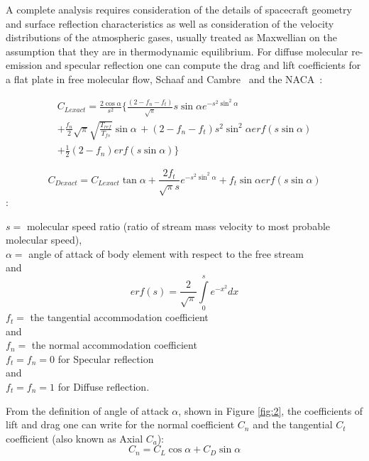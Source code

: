 A complete analysis requires consideration of the details of spacecraft
geometry and surface reflection characteristics as well as consideration
of the velocity distributions of the atmospheric gases, usually treated
as Maxwellian on the assumption that they are in thermodynamic equilibrium.
For diffuse molecular re-emission and specular reflection one can compute
the drag and lift coefficients for a flat plate in free molecular flow,
Schaaf and Cambre~\cite{SC} and the NACA~\cite{NACA}:

\begin{equation}
\begin{split}
C_{Lexact}  = \frac{{2\cos \alpha }}{{s^2 }}\{ \frac{{(2 - f_n  - f_t )}}{{\sqrt \pi  }}s\sin \alpha e^{ - s^2 \sin ^2 \alpha } \\
  + \frac{{f_n }}{2}\sqrt \pi  \sqrt {\frac{{T_{ref} }}{{T_{fs} }}} \sin \alpha \, + (2 - f_n  - f_t )s^2 \sin ^2 \alpha erf(s\sin \alpha )\\
 + \frac{1}{2}(2 - f_n )erf(s\sin \alpha )\}
\end{split}
\end{equation}

\begin{equation}
C_{Dexact}  = C_{Lexact} \tan \alpha  + \frac{{2f_t }}{{\sqrt \pi  s}}e^{ - s^2 \sin ^2 \alpha }  + f_t \sin \alpha erf(s\sin \alpha )
\end{equation}
:

$s =$ molecular speed ratio (ratio of stream mass velocity to most probable molecular speed),\\
$\alpha =$ angle of attack of body element with respect to the free stream \\
and
\begin{equation}
erf(s) = \frac{2}{{\sqrt \pi  }}\int\limits_0^s {e^{ - x^2 } } dx
\end{equation}
$f_t  =$ the tangential accommodation coefficient \\
and \\
$f_n  =$ the normal accommodation coefficient \\
$f_t  = f_n  = 0 $ for Specular reflection \\
and \\
$f_t  = f_n  = 1$ for Diffuse reflection.

From the definition of angle of attack $\alpha$, shown
in Figure \ref{fig:2},
the coefficients of lift and drag one can
write for the normal coefficient $C_n$ and the tangential $C_t$
coefficient (also known as Axial $C_a$):
\begin{equation}
  C_n  = C_L \cos \alpha  + C_D \sin \alpha
\end{equation}

